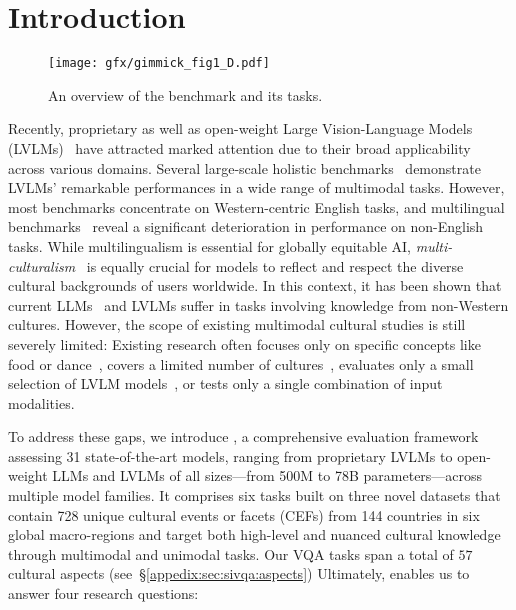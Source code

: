 \section{Introduction}
\label{sec:intro}
%
\begin{figure*}[t]
    \centering
    \texttt{[image: gfx/gimmick\_fig1\_D.pdf]}
    \caption{An overview of the \dsname benchmark and its tasks.}
    \label{fig:figure1}
\end{figure*}

%
Recently, proprietary as well as open-weight Large Vision-Language Models (LVLMs)~\cite[\textit{inter alia}]{openai2023gpt4v,liu2023llava,wang2024qwen2vl,chen2024internvl} have attracted marked attention due to their broad applicability across various domains.
%
Several large-scale holistic benchmarks~\cite{duan2024vlmevalkit,yue2023mmmu,fu2023mme} demonstrate LVLMs' remarkable performances in a wide range of multimodal tasks. %
%
However, most benchmarks concentrate on Western-centric English tasks, and multilingual benchmarks~\cite{ahuja2023megaverse,schneider-sitaram-2024-m5} reveal a significant deterioration in performance on non-English tasks.
%
While multilingualism is essential for globally equitable AI, \emph{multi-culturalism}~\cite{gabriel2020aivalues,adilazuarda-etal-2024-towards} is equally crucial for models to reflect and respect the diverse cultural backgrounds of users worldwide.
%
In this context, it has been shown that current LLMs~\cite{myung2024blend,chiu2024culturalbench} and LVLMs suffer in tasks involving knowledge from non-Western cultures. However, the scope of existing multimodal cultural studies is still severely limited:
%
Existing research often focuses only on specific concepts like food or dance~\cite{winata2024worldcuisines,burda2024culturally}, covers a limited number of cultures~\cite{urailertprasert-etal-2024-sea,baek2024kviscuit}, evaluates only a small selection of LVLM models~\cite{cao2024exploring,nayak-etal-2024-benchmarking}, or tests only a single combination of input modalities.%

\noindent To address these gaps, we introduce \dsname, a comprehensive evaluation framework assessing 31 state-of-the-art models, ranging from proprietary LVLMs to open-weight LLMs and LVLMs of all sizes---from 500M to 78B parameters---across multiple model families.
%
It comprises six tasks built on three novel datasets that contain 728 unique cultural events or facets (CEFs) from 144 countries in six global macro-regions and target both high-level and nuanced cultural knowledge through multimodal and unimodal tasks.
%
Our VQA tasks span a total of $57$ cultural aspects (see~\S\ref{appedix:sec:sivqa:aspects})
%
Ultimately, \dsname enables us to answer four research questions:

